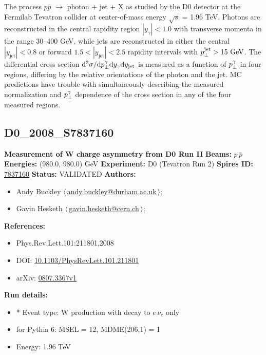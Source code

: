 \noindent The process $p \bar{p}$ \ensuremath{\to} photon + jet + X as studied by the D0 detector at the Fermilab Tevatron collider at center-of-mass energy \ensuremath{\sqrt{s}} = 1.96 TeV. Photons are reconstructed in the central rapidity region $|y_\gamma| < 1.0$ with transverse momenta in the range 30--400 GeV, while jets are reconstructed in either the central $|y_\text{jet}| < 0.8$ or forward $1.5 < |y_\text{jet}| < 2.5$ rapidity intervals with $p_\perp^\text{jet} > 15~\text{GeV}$. The differential cross section $\mathrm{d}^3 \sigma / \mathrm{d}{p_\perp^\gamma} \mathrm{d}{y_\gamma} \mathrm{d}{y_\text{jet}}$ is measured as a function of $p_\perp^\gamma$ in four regions, differing by the relative orientations of the photon and the jet.  MC predictions have trouble with simultaneously describing the measured normalization and $p_\perp^\gamma$ dependence of the cross section in any of the four measured regions.

\clearpage


\clearpage

\subsection[D0\_2008\_S7837160]{D0\_2008\_S7837160\,\cite{Abazov:2008qv}}
\textbf{Measurement of W charge asymmetry from D0 Run II}\newline
\textbf{Beams:} $p$\,$\bar{p}$ \newline
\textbf{Energies:} (980.0, 980.0) GeV \newline
\textbf{Experiment:} D0 (Tevatron Run 2) \newline
\textbf{Spires ID:} \href{http://www.slac.stanford.edu/spires/find/hep/www?rawcmd=key+7837160}{7837160}\newline
\textbf{Status:} VALIDATED\newline
\textbf{Authors:}
\begin{itemize}
  \item Andy Buckley $\langle\,$\href{mailto:andy.buckley@durham.ac.uk}{andy.buckley@durham.ac.uk}$\,\rangle$;
  \item Gavin Hesketh $\langle\,$\href{mailto:gavin.hesketh@cern.ch}{gavin.hesketh@cern.ch}$\,\rangle$;
\end{itemize}
\textbf{References:}
\begin{itemize}
  \item Phys.Rev.Lett.101:211801,2008
  \item DOI: \href{http://dx.doi.org/10.1103/PhysRevLett.101.211801}{10.1103/PhysRevLett.101.211801}
  \item arXiv: \href{http://arxiv.org/abs/0807.3367v1}{0807.3367v1}
\end{itemize}
\textbf{Run details:}
\begin{itemize}

  \item * Event type: W production with decay to $e \, \nu_e$ only
  \item for Pythia 6: MSEL = 12, MDME(206,1) = 1
  \item Energy: 1.96 TeV\end{itemize}

